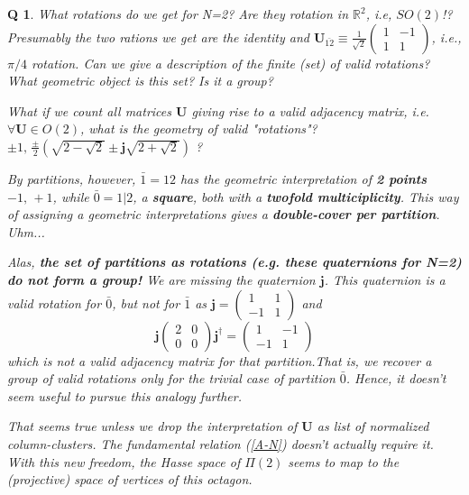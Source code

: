 \documentclass[twocolumn,aps,sort,nofootinbib]{revtex4}
\newtheorem{question}{Q}
\begin{document}
\begin{question}
	What rotations do we get for N=2? Are they rotation in $\mathbb{R}^2$, i.e, $SO(2)$!? Presumably the two rations we get are the identity and 
$\boldsymbol{U}_{\bar{12}}\equiv\frac{1}{\sqrt{2}}\left(\begin{array}{cc}1 & -1\\1 & 1\end{array}\right)$, i.e., $\pi/4$ rotation. Can we give a description of the finite (set) of
	valid rotations? What geometric object is this set? Is it a group? 
	
	What if we count all matrices $\boldsymbol{U}$ giving rise to a valid adjacency matrix, 
	i.e. $\forall\boldsymbol{U}\in O(2)$, what is
	the geometry of valid "rotations"? $\pm 1,\,\frac{\pm}{2}(\sqrt{2-\sqrt{2}}\pm\mathbf{j}\sqrt{2+\sqrt{2}})$ ? 
	
	By partitions, however, $\bar{1}=12$ has the geometric interpretation of \textbf{2 points} $-1,\,+1$, while $\bar{0}=1|2$, a \textbf{square}, 
	both with a \textbf{twofold multiciplicity}. This way of assigning a geometric interpretations gives a \textbf{double-cover per partition}. Uhm...

	Alas, \textbf{the set of partitions as rotations (e.g. these quaternions for N=2) do not form a group!} We are missing the quaternion $\boldsymbol{j}$.
This quaternion is a valid rotation for $\bar{0}$, but not for $\bar{1}$ as $\boldsymbol{j}=\begin{pmatrix}1&1\\-1&1\end{pmatrix}$ and 
	\begin{equation}
	\boldsymbol{j}\begin{pmatrix}2&0\\0&0\end{pmatrix}{\boldsymbol{j}}^{\dagger}=\begin{pmatrix}1&-1\\-1&1\end{pmatrix}
	\end{equation}
	which is not a valid adjacency matrix for that partition.That is, we recover a group of valid rotations only for the trivial case of partition $\bar{0}$.
		Hence, it doesn't seem useful to pursue this analogy further.

		That seems true unless we drop the interpretation of $\boldsymbol{U}$ as list of \textit{normalized column-clusters}. The fundamental relation (\ref{A-N}) 
		doesn't actually require it. With this new freedom, the Hasse space of $\Pi(2)$ seems to map to the (projective) space of vertices of this octagon.


\end{question}
\end{document}
